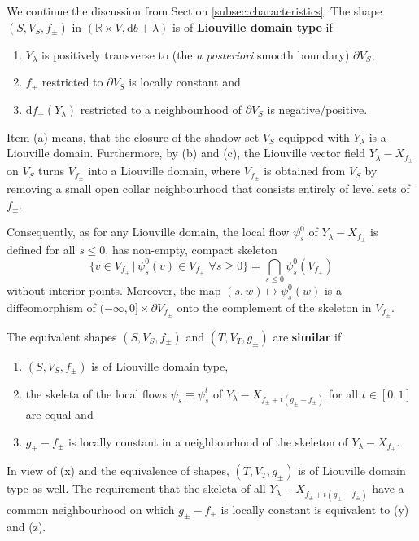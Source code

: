 \documentclass{amsart}
\theoremstyle{definition}
\newcommand{\rmd}{\mathrm d}
\newcommand{\R}{\mathbb R}
\begin{document}
We continue the discussion from Section \ref{subsec:characteristics}.
The shape $(S,V_S,f_{\pm})$
in $(\R\times V,\rmd b+\lambda)$
is of {\bf Liouville domain type} if
  	\begin{enumerate}
 	\item[(a)]
	  $Y_{\lambda}$ is positively transverse to
	  (the {\it a posteriori} smooth boundary) $\partial V_S$,
 	\item[(b)]
	  $f_{\pm}$ restricted to $\partial V_S$ is locally constant and
 	\item[(c)]
	  $\rmd f_{\pm}(Y_{\lambda})$ restricted to a neighbourhood
	  of $\partial V_S$ is negative/positive.
	\end{enumerate}
Item (a) means,
that the closure of the shadow set $V_S$ equipped with
$Y_{\lambda}$ is a Liouville domain.
Furthermore, by (b) and (c),
the Liouville vector field $Y_{\lambda}-X_{f_{\pm}}$ on $V_S$
turns $V_{f_{\pm}}\!$ into a Liouville domain,
where $V_{f_{\pm}}\!$ is obtained from $V_S$ by removing
a small open collar neighbourhood
that consists entirely of level sets of $f_{\pm}$.

Consequently,
as for any Liouville domain,
the local flow $\psi_s^0$ of $Y_{\lambda}-X_{f_{\pm}}$
is defined for all $s\leq0$,
has non-empty, compact skeleton
\[
\Big\{
v\in V_{f_{\pm}}
\,\Big|\,
\psi_s^0(v)\in V_{f_{\pm}}
\,\,
\forall s\geq0
\Big\}
=
\bigcap_{s\leq0}\psi_s^0(V_{f_{\pm}})
\]
without interior points.
Moreover,
the map $(s,w)\mapsto\psi_s^0(w)$
is a diffeomorphism of $(-\infty,0]\times\partial V_{f_{\pm}}\!$
onto the complement of the skeleton in $V_{f_{\pm}}\!$.

The equivalent shapes
$(S,V_S,f_{\pm})$ and $(T,V_T,g_{\pm})$
are {\bf similar} if
  	\begin{enumerate}
 	\item[(x)]
	$(S,V_S,f_{\pm})$ is of Liouville domain type,
 	\item[(y)]
	the skeleta of the local flows
	$\psi_s\equiv\psi_s^t$ of
        $Y_{\lambda}-X_{f_{\pm}+t(g_{\pm}-f_{\pm})}$
	for all $t\in[0,1]$ are equal and
 	\item[(z)]
	$g_{\pm}-f_{\pm}$ is locally constant
	in a neighbourhood of the skeleton
	of $Y_{\lambda}-X_{f_{\pm}}$.
	\end{enumerate}
In view of (x) and the equivalence of shapes,
$(T,V_T,g_{\pm})$ is of Liouville domain type as well.
The requirement that the skeleta of all
$Y_{\lambda}-X_{f_{\pm}+t(g_{\pm}-f_{\pm})}$
have a common neighbourhood
on which $g_{\pm}-f_{\pm}$ is locally constant
is equivalent to (y) and (z).
\end{document}
